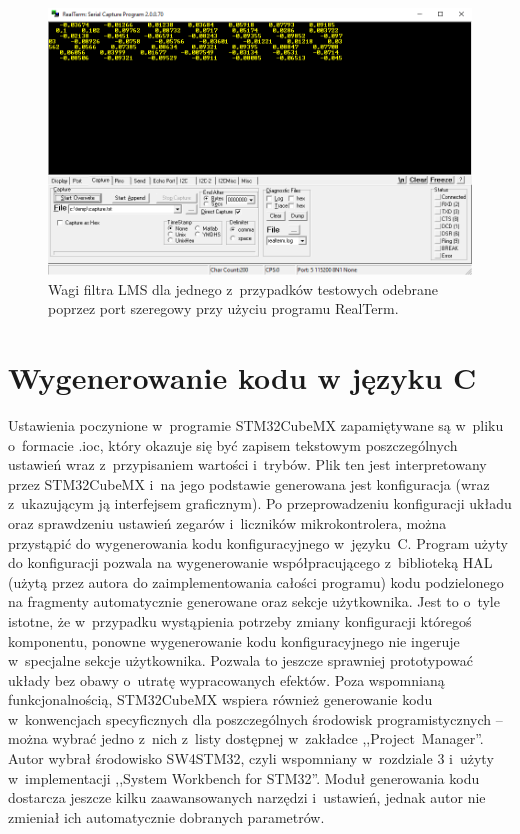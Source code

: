 \begin{itemize}
	\begin{figure}[h!]
		\centering
		\includegraphics[scale=0.5]{../Assets/RealTerm.png}
		\caption{Wagi filtra LMS dla jednego z~przypadków testowych odebrane poprzez port szeregowy przy użyciu programu RealTerm.}
		\label{fig:realterm}
	\end{figure}
\end{itemize}
\section{Wygenerowanie kodu w języku C}
\label{sec:configGenerate}
Ustawienia poczynione w~programie STM32CubeMX zapamiętywane są w~pliku o~formacie .ioc, który okazuje się być zapisem tekstowym poszczególnych ustawień wraz z~przypisaniem wartości i~trybów. Plik ten jest interpretowany przez STM32CubeMX i~na jego podstawie generowana jest konfiguracja (wraz z~ukazującym ją interfejsem graficznym). Po przeprowadzeniu konfiguracji układu oraz sprawdzeniu ustawień zegarów i~liczników mikrokontrolera, można przystąpić do wygenerowania kodu konfiguracyjnego w~języku~C. Program użyty do konfiguracji pozwala na wygenerowanie współpracującego z~biblioteką HAL (użytą przez autora do zaimplementowania całości programu) kodu podzielonego na fragmenty automatycznie generowane oraz sekcje użytkownika. Jest to o~tyle istotne, że w~przypadku wystąpienia potrzeby zmiany konfiguracji któregoś komponentu, ponowne wygenerowanie kodu konfiguracyjnego nie ingeruje w~specjalne sekcje użytkownika. Pozwala to jeszcze sprawniej prototypować układy bez obawy o~utratę wypracowanych efektów. Poza wspomnianą funkcjonalnością, STM32CubeMX wspiera również generowanie kodu w~konwencjach specyficznych dla poszczególnych środowisk programistycznych -- można wybrać jedno z~nich z~listy dostępnej w~zakładce ,,Project~Manager''. Autor wybrał środowisko SW4STM32, czyli wspomniany w~rozdziale 3 i~użyty w~implementacji ,,System Workbench for STM32''. Moduł generowania kodu dostarcza jeszcze kilku zaawansowanych narzędzi i~ustawień, jednak autor nie zmieniał ich automatycznie dobranych parametrów.